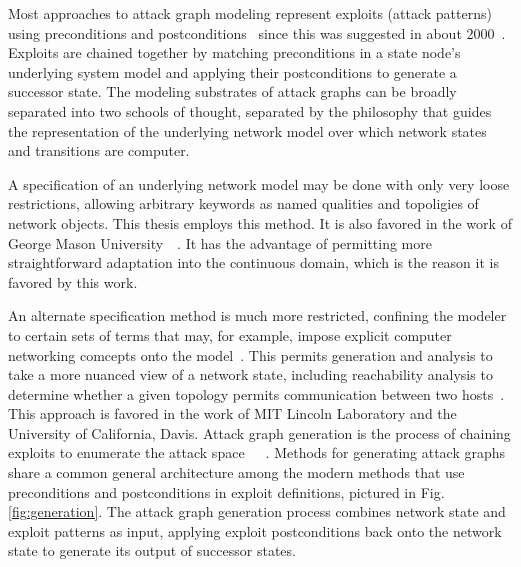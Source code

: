 Most approaches to attack graph modeling represent exploits (attack patterns) using
preconditions and postconditions~\cite{lippmann2005annotated} since this was suggested in about 2000~\cite{templeton2001requires}. Exploits are chained together by matching preconditions in a state node's
underlying system model and applying their postconditions to generate a successor state.
The modeling substrates of attack graphs can be broadly separated into two schools of
thought, separated by the philosophy that guides the representation of the underlying
network model over which network states and transitions are computer.

A specification of an underlying network model may be done with only very loose
restrictions, allowing arbitrary keywords as named qualities and topoligies of network objects.
This thesis employs this method. It is also favored in the work of George Mason 
University~\cite{ammann2002scalable}~\cite{wang2006minimum}. It has the advantage of
permitting more straightforward adaptation into the continuous domain, which is the reason
it is favored by this work. 

An alternate specification method is much more restricted, confining the modeler to
certain sets of terms that may, for example, impose explicit computer networking 
comcepts onto the model~\cite{templeton2001requires}.
This permits generation and analysis to take a
more nuanced view of a network state, including reachability analysis to determine whether a
given topology permits communication between two hosts~\cite{ingols2009modeling}. This approach
is favored in the work of MIT Lincoln Laboratory and the University of California, Davis.
Attack graph generation is the process of chaining exploits to enumerate the
attack space~\cite{campbell2002modeling}~\cite{phillips1998graph}~\cite{sheyner2002automated}.
Methods for generating attack graphs
share a common general architecture among the modern
methods that use preconditions and postconditions in exploit definitions,
pictured in Fig. \ref{fig:generation}. The attack graph generation
process combines network state and exploit patterns as input, applying exploit postconditions
back onto the network state to generate its output of successor states.

